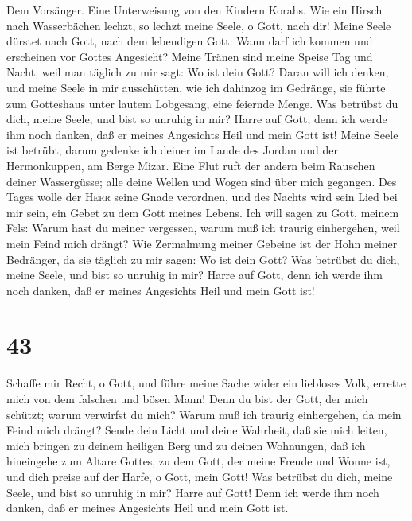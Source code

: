  Dem Vorsänger. Eine Unterweisung von den Kindern Korahs.
Wie ein Hirsch nach Wasserbächen lechzt, so lechzt meine Seele, o Gott,
nach dir!  Meine Seele dürstet nach Gott, nach dem
lebendigen Gott: Wann darf ich kommen und erscheinen vor Gottes
Angesicht?  Meine Tränen sind meine Speise Tag und Nacht,
weil man täglich zu mir sagt: Wo ist dein Gott?  Daran
will ich denken, und meine Seele in mir ausschütten, wie ich dahinzog im
Gedränge, sie führte zum Gotteshaus unter lautem Lobgesang, eine
feiernde Menge.  Was betrübst du dich, meine Seele, und
bist so unruhig in mir? Harre auf Gott; denn ich werde ihm noch danken,
daß er meines Angesichts Heil und mein Gott ist!  Meine
Seele ist betrübt; darum gedenke ich deiner im Lande des Jordan und der
Hermonkuppen, am Berge Mizar.  Eine Flut ruft der andern
beim Rauschen deiner Wassergüsse; alle deine Wellen und Wogen sind über
mich gegangen.  Des Tages wolle der \textsc{Herr} seine
Gnade verordnen, und des Nachts wird sein Lied bei mir sein, ein Gebet
zu dem Gott meines Lebens.  Ich will sagen zu Gott, meinem
Fels: Warum hast du meiner vergessen, warum muß ich traurig einhergehen,
weil mein Feind mich drängt?  Wie Zermalmung meiner
Gebeine ist der Hohn meiner Bedränger, da sie täglich zu mir sagen: Wo
ist dein Gott?  Was betrübst du dich, meine Seele, und
bist so unruhig in mir? Harre auf Gott, denn ich werde ihm noch danken,
daß er meines Angesichts Heil und mein Gott ist!

\hypertarget{section-42}{%
\section{43}\label{section-42}}

 Schaffe mir Recht, o Gott, und führe meine Sache wider
ein liebloses Volk, errette mich von dem falschen und bösen Mann!
 Denn du bist der Gott, der mich schützt; warum verwirfst
du mich? Warum muß ich traurig einhergehen, da mein Feind mich drängt?
 Sende dein Licht und deine Wahrheit, daß sie mich leiten,
mich bringen zu deinem heiligen Berg und zu deinen Wohnungen,
 daß ich hineingehe zum Altare Gottes, zu dem Gott, der
meine Freude und Wonne ist, und dich preise auf der Harfe, o Gott, mein
Gott!  Was betrübst du dich, meine Seele, und bist so
unruhig in mir? Harre auf Gott! Denn ich werde ihm noch danken, daß er
meines Angesichts Heil und mein Gott ist.

